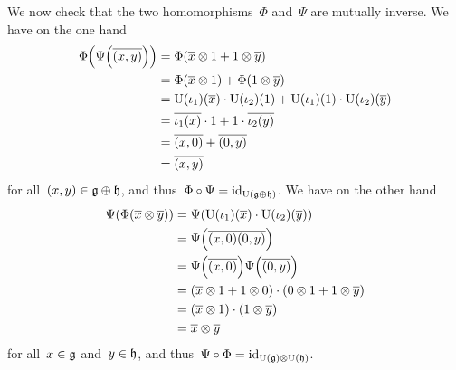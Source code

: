 \begin{example}
\begin{itemize}
      We now check that the two homomorphisms~$\Phi$ and~$\Psi$ are mutually inverse.
      We have on the one hand
      \begin{align*}
        \Phi\Bigl( \Psi\Bigl( \overline{(x,y)} \Bigr) \Bigr)
        &=
        \Phi( \overline{x} \otimes 1 + 1 \otimes \overline{y} )
        \\
        &=
        \Phi( \overline{x} \otimes 1 ) + \Phi( 1 \otimes \overline{y} )
        \\
        &=
        \operatorname{U}(\iota_1)(\overline{x}) \cdot \operatorname{U}(\iota_2)(1)
        + \operatorname{U}(\iota_1)(1) \cdot \operatorname{U}(\iota_2)(\overline{y})
        \\
        &=
        \overline{\iota_1(x)} \cdot 1
        + 1 \cdot \overline{\iota_2(y)}
        \\
        &=
        \overline{(x,0)} + \overline{(0,y)}
        \\
        &=
        \overline{(x,y)}
      \end{align*}
      for all~$(x,y) \in \mathfrak{g} \oplus \mathfrak{h}$, and thus~$\Phi \circ \Psi = \mathrm{id}_{\operatorname{U}(\mathfrak{g} \oplus \mathfrak{h})}$.
      We have on the other hand
      \begin{align*}
        \Psi( \Phi( \overline{x} \otimes \overline{y} ) )
        &=
        \Psi( \operatorname{U}(\iota_1)(\overline{x}) \cdot \operatorname{U}(\iota_2)(\overline{y}) )
        \\
        &=
        \Psi\Bigl( \overline{(x,0)} \overline{(0,y)} \Bigr)
        \\
        &=
        \Psi\Bigl( \overline{(x,0)} \Bigr)
        \Psi\Bigl( \overline{(0,y)} \Bigr)
        \\
        &=
        ( \overline{x} \otimes 1 + 1 \otimes 0 )
        \cdot ( 0 \otimes 1 + 1 \otimes \overline{y} )
        \\
        &=
        (\overline{x} \otimes 1)
        \cdot (1 \otimes \overline{y})
        \\
        &=
        \overline{x} \otimes \overline{y}
      \end{align*}
      for all~$x \in \mathfrak{g}$ and~$y \in \mathfrak{h}$, and thus~$\Psi \circ \Phi = \mathrm{id}_{\operatorname{U}(\mathfrak{g}) \otimes \operatorname{U}(\mathfrak{h})}$.
  \end{itemize}
\end{example}


